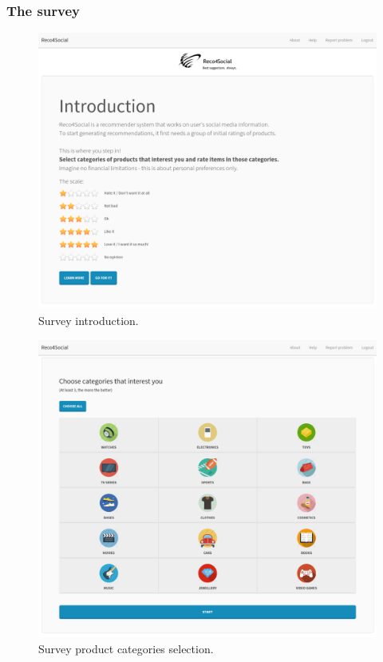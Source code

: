 \documentclass[12pt]{report}
\begin{document}
\subsubsection{The survey}
\begin{figure}[!t]
\centering
\includegraphics[width=\textwidth]{reco4_survey-intro-1.png} 
\caption[Survey introduction.]{Survey introduction.}
\label{fig.survey.intro-1}
\end{figure}

\begin{figure}[!t]
\centering
\includegraphics[width=\textwidth]{reco4_survey-intro-2.png} 
\caption[Survey product categories selection.]{Survey product categories selection.}
\label{fig.survey.intro-2}
\end{figure}
\end{document}
